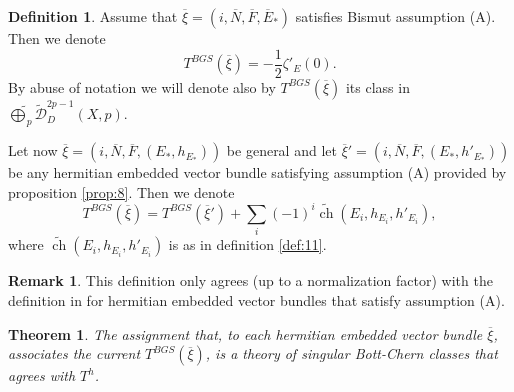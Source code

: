 \documentclass[10pt,twoside]{article}
\numberwithin{equation}{section}
\theoremstyle{plain}
\newtheorem{theorem}[equation]{Theorem}
\theoremstyle{definition}
\newtheorem{definition}[equation]{Definition}
\newtheorem{remark}[equation]{Remark}
\DeclareMathOperator{\ch}{ch}
\begin{document}
\begin{definition} \label{def:9}
  Assume that $\overline {\xi}=(i,\overline N,\overline
F, \overline E_{\ast})$ satisfies Bismut assumption (A). Then we denote
\begin{displaymath}
  T^{BGS}(\overline {\xi})=-\frac{1}{2}\zeta '_{E}(0). 
\end{displaymath}
By abuse of notation we will denote also by $T^{BGS}(\overline {\xi})$
its class in $\widetilde
  \bigoplus_{p} \widetilde
{\mathcal{D}}^{2p-1}_{D}(X,p). $

Let now
  $\overline {\xi}=(i,\overline N,\overline
F, (E_{\ast},h_{E_{\ast}}))$ be general and let $\overline
{\xi}'=(i,\overline N,\overline 
F, (E_{\ast},h'_{E_{\ast}}))$ be any hermitian embedded vector bundle
satisfying
assumption (A) provided by proposition \ref{prop:8}. 
Then we denote
\begin{displaymath}
  T^{BGS}(\overline{\xi})=T^{BGS}(\overline{\xi}')+
  \sum_{i}(-1)^{i}\widetilde 
{\ch}(E_{i},h_{E_{i}},h'_{E_{i}}), 
\end{displaymath}
where $\widetilde 
{\ch}(E_{i},h_{E_{i}},h'_{E_{i}})$ is as in definition \ref{def:11}. 
\end{definition}

\begin{remark}
  This definition only agrees (up to a normalization factor) with the
  definition in \cite{BismutGilletSoule:MR1086887} 
  for hermitian embedded vector bundles that satisfy assumption (A).
\end{remark}

\begin{theorem}
  The assignment that, to each hermitian embedded vector bundle
  $\overline {\xi}$,  associates the current
  $T^{BGS}(\overline{\xi})$, is a 
  theory of singular Bott-Chern classes that agrees with $T^{h}$.
\end{theorem}
\end{document}
